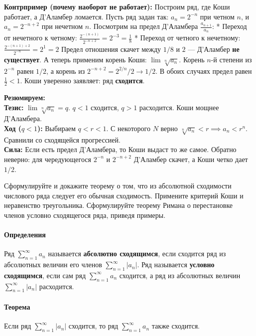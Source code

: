 \textbf{Контрпример (почему наоборот не работает):}
Построим ряд, где Коши работает, а Д'Аламбер ломается. Пусть ряд задан так: $a_n = 2^{-n}$ при четном $n$, и $a_n = 2^{-n+2}$ при нечетном $n$.
Посмотрим на предел Д'Аламбера $\frac{a_{n+1}}{a_n}$:
* Переход от нечетного к четному: $\frac{2^{-(n+1)}}{2^{-n+2}} = 2^{-3} = \frac{1}{8}$
* Переход от четного к нечетному: $\frac{2^{-(n+1)+2}}{2^{-n}} = 2^1 = 2$
Предел отношения скачет между $1/8$ и $2$ — Д'Аламбер \textbf{не существует}.
А теперь применим корень Коши: $\lim \sqrt[n]{a_n}$. Корень $n$-й степени из $2^{-n}$ равен $1/2$, а корень из $2^{-n+2} = 2^{2/n}/2 \to 1/2$. В обоих случаях предел равен $\frac{1}{2} < 1$. Коши уверенно заявляет: ряд \textbf{сходится}.



\begin{tcolorbox}[colback=gray!5, colframe=black, boxrule=0.5pt, arc=0pt]
\textbf{Резюмируем:} \\
\textbf{Тезис:} $\lim \sqrt[n]{a_n} = q$. $q<1$ сходится, $q>1$ расходится. Коши мощнее Д'Аламбера. \\
\textbf{Ход ($q<1$):} Выбираем $q < r < 1$. С некоторого $N$ верно $\sqrt[n]{a_n} < r \implies a_n < r^n$. Сравнили со сходящейся прогрессией. \\
\textbf{Сила:} Если есть предел Д'Аламбера, то Коши выдаст то же самое. Обратно неверно: для чередующегося $2^{-n}$ и $2^{-n+2}$ Д'Аламбер скачет, а Коши четко дает $1/2$.
\end{tcolorbox}


{Сформулируйте и докажите теорему о том, что из абсолютной сходимости числового ряда следует его обычная сходимость. Примените критерий Коши и неравенство треугольника. Сформулируйте теорему Римана о перестановке членов условно сходящегося ряда, приведя примеры.}

\paragraph{Определения}
Ряд $\sum_{n=1}^\infty a_n$ называется \textbf{абсолютно сходящимся}, если сходится ряд из абсолютных величин его членов $\sum_{n=1}^\infty |a_n|$.
Ряд называется \textbf{условно сходящимся}, если сам ряд $\sum_{n=1}^\infty a_n$ сходится, а ряд из абсолютных величин $\sum_{n=1}^\infty |a_n|$ расходится.

\paragraph{Теорема}
Если ряд $\sum_{n=1}^\infty |a_n|$ сходится, то ряд $\sum_{n=1}^\infty a_n$ также сходится.

